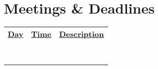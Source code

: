 \documentclass[a4paper,12pt]{article}
\begin{document}
\hrulefill

\hrulefill

\hrulefill

\hrulefill

\section*{Meetings \& Deadlines}
\begin{tabular}{p{}|p{}|p{}}
    \underline{\textbf{Day}} & \underline{\textbf{Time}} & \underline{\textbf{Description}} \\
    \vspace{0.2cm}\hrulefill & \vspace{0.2cm}\hrulefill & \vspace{0.2cm}\hrulefill \\
    \hrulefill & \hrulefill & \hrulefill \\
    \hrulefill & \hrulefill & \hrulefill \\
    \hrulefill & \hrulefill & \hrulefill \\
    \hrulefill & \hrulefill & \hrulefill \\
    \hrulefill & \hrulefill & \hrulefill \\
    \hrulefill & \hrulefill & \hrulefill \\
    \hrulefill & \hrulefill & \hrulefill \\
\end{tabular}
\end{document}
